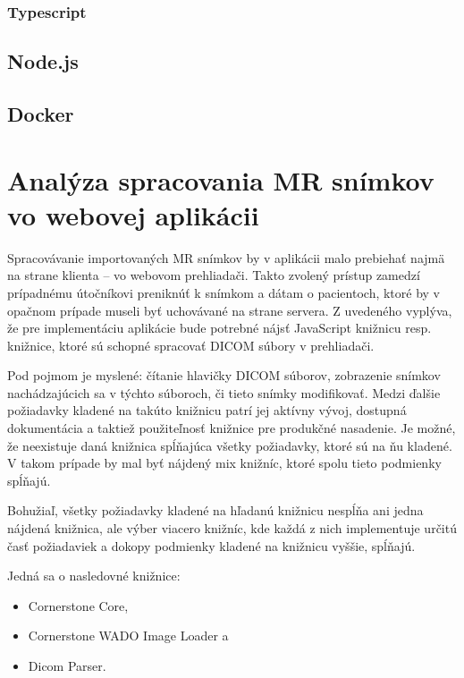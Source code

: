 \subsubsection {Typescript}

\subsection {Node.js}

\subsection {Docker}

\section {Analýza spracovania MR snímkov vo webovej aplikácii}
Spracovávanie importovaných MR snímkov by v aplikácii malo prebiehať najmä na strane klienta -- vo webovom prehliadači. Takto zvolený prístup zamedzí prípadnému útočníkovi preniknúť k snímkom a dátam o pacientoch, ktoré by v opačnom prípade museli byť uchovávané na strane servera. Z uvedeného vyplýva, že pre implementáciu aplikácie bude potrebné nájsť JavaScript knižnicu resp. knižnice, ktoré sú schopné spracovať DICOM súbory v prehliadači.

Pod pojmom  je myslené: čítanie hlavičky DICOM súborov, zobrazenie snímkov nachádzajúcich sa v týchto súboroch, či tieto snímky modifikovať. Medzi ďalšie požiadavky kladené na takúto knižnicu patrí jej aktívny vývoj, dostupná dokumentácia a taktiež použiteľnosť knižnice pre produkčné nasadenie. Je možné, že neexistuje daná knižnica spĺňajúca všetky požiadavky, ktoré sú na ňu kladené. V takom prípade by mal byť nájdený mix knižníc, ktoré spolu tieto podmienky spĺňajú.

Bohužiaľ, všetky požiadavky kladené na hľadanú knižnicu nespĺňa ani jedna nájdená knižnica, ale výber viacero knižníc, kde každá z nich implementuje určitú časť požiadaviek a dokopy podmienky kladené na knižnicu vyššie, spĺňajú.

Jedná sa o nasledovné knižnice:
\begin {itemize}
\item {Cornerstone Core,}
\item {Cornerstone WADO Image Loader a}
\item {Dicom Parser.}
\end {itemize}

